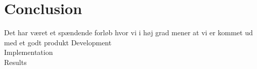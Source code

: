 \chapter{Conclusion}
Det har været et spændende forløb hvor vi i høj grad mener at vi er kommet ud med et godt produkt
Development\\
Implementation\\
Results\\
